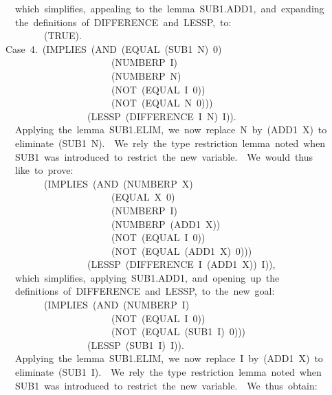 \documentclass[11pt]{book}
\newenvironment{pubasis}{\begin{flushleft}\ttfamily\small}{\normalsize\rmfamily\end{flushleft}}
\begin{document}
\begin{pubasis}
~~which~simplifies,~appealing~to~the~lemma~SUB1.ADD1,~and~expanding\\
~~the~definitions~of~DIFFERENCE~and~LESSP,~to:\\

~~~~~~~~(TRUE).\\

Case~4.~(IMPLIES~(AND~(EQUAL~(SUB1~N)~0)\\
~~~~~~~~~~~~~~~~~~~~~~(NUMBERP~I)\\
~~~~~~~~~~~~~~~~~~~~~~(NUMBERP~N)\\
~~~~~~~~~~~~~~~~~~~~~~(NOT~(EQUAL~I~0))\\
~~~~~~~~~~~~~~~~~~~~~~(NOT~(EQUAL~N~0)))\\
~~~~~~~~~~~~~~~~~(LESSP~(DIFFERENCE~I~N)~I)).\\

~~Applying~the~lemma~SUB1.ELIM,~we~now~replace~N~by~(ADD1~X)~to\\
~~eliminate~(SUB1~N).~~We~rely~the~type~restriction~lemma~noted~when\\
~~SUB1~was~introduced~to~restrict~the~new~variable.~~We~would~thus\\
~~like~to~prove:\\

~~~~~~~~(IMPLIES~(AND~(NUMBERP~X)\\
~~~~~~~~~~~~~~~~~~~~~~(EQUAL~X~0)\\
~~~~~~~~~~~~~~~~~~~~~~(NUMBERP~I)\\
~~~~~~~~~~~~~~~~~~~~~~(NUMBERP~(ADD1~X))\\
~~~~~~~~~~~~~~~~~~~~~~(NOT~(EQUAL~I~0))\\
~~~~~~~~~~~~~~~~~~~~~~(NOT~(EQUAL~(ADD1~X)~0)))\\
~~~~~~~~~~~~~~~~~(LESSP~(DIFFERENCE~I~(ADD1~X))~I)),\\

~~which~simplifies,~applying~SUB1.ADD1,~and~opening~up~the\\
~~definitions~of~DIFFERENCE~and~LESSP,~to~the~new~goal:\\

~~~~~~~~(IMPLIES~(AND~(NUMBERP~I)\\
~~~~~~~~~~~~~~~~~~~~~~(NOT~(EQUAL~I~0))\\
~~~~~~~~~~~~~~~~~~~~~~(NOT~(EQUAL~(SUB1~I)~0)))\\
~~~~~~~~~~~~~~~~~(LESSP~(SUB1~I)~I)).\\

~~Applying~the~lemma~SUB1.ELIM,~we~now~replace~I~by~(ADD1~X)~to\\
~~eliminate~(SUB1~I).~~We~rely~the~type~restriction~lemma~noted~when\\
~~SUB1~was~introduced~to~restrict~the~new~variable.~~We~thus~obtain:\\


\end{pubasis}
\end{document}
